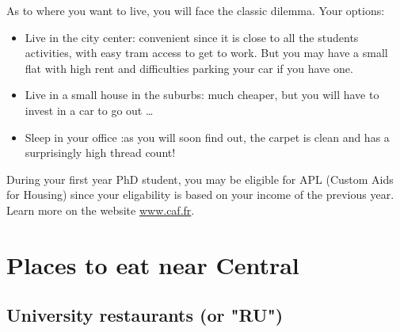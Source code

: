 As to where you want to live, you will face the classic dilemma. Your options:
\begin{itemize}
  \item Live in the city center: convenient since it is close to all the students activities, with easy tram access to get to work. But you may have a small flat with high rent and difficulties parking your car if you have one.
  \item Live in a small house in the suburbs: much cheaper, but you will have to invest in a car to go out \dots
  \item Sleep in your office :as you will soon find out, the carpet is clean and has a surprisingly high thread count! 
\end{itemize}

During your first year PhD student, you may be eligible for APL (Custom Aids for Housing) since your eligability is based on your income of the previous year.
Learn more on the website \url{www.caf.fr}.

\section{Places to eat near Central}

\subsection{University restaurants (or "RU")}

